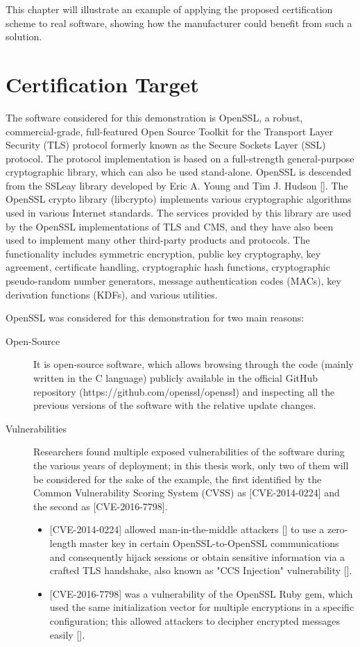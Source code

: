 This chapter will illustrate an example of applying the proposed certification scheme to real software, showing how the manufacturer could benefit from such a solution.

\section{Certification Target}
The software considered for this demonstration is OpenSSL, a robust, commercial-grade, full-featured Open Source Toolkit for the Transport Layer Security (TLS) protocol formerly known as the Secure Sockets Layer (SSL) protocol. The protocol implementation is based on a full-strength general-purpose cryptographic library, which can also be used stand-alone.
OpenSSL is descended from the SSLeay library developed by Eric A. Young and Tim J. Hudson []. The OpenSSL crypto library (libcrypto) implements various cryptographic algorithms used in various Internet standards. The services provided by this library are used by the OpenSSL implementations of TLS and CMS, and they have also been used to implement many other third-party products and protocols.
The functionality includes symmetric encryption, public key cryptography, key agreement, certificate handling, cryptographic hash functions, cryptographic pseudo-random number generators, message authentication codes (MACs), key derivation functions (KDFs), and various utilities.

OpenSSL was considered for this demonstration for two main reasons:
\begin{description}
    \item[Open-Source] It is open-source software, which allows browsing through the code (mainly written in the C language) publicly available in the official GitHub repository (https://github.com/openssl/openssl) and inspecting all the previous versions of the software with the relative update changes.
    \item[Vulnerabilities] Researchers found multiple exposed vulnerabilities of the software during the various years of deployment; in this thesis work, only two of them will be considered for the sake of the example, the first identified by the Common Vulnerability Scoring System (CVSS) as [CVE-2014-0224] and the second as [CVE-2016-7798].
    
    \begin{itemize}
        \item {[CVE-2014-0224]} allowed man-in-the-middle attackers [] to use a zero-length master key in certain OpenSSL-to-OpenSSL communications and consequently hijack sessions or obtain sensitive information via a crafted TLS handshake, also known as "CCS Injection" vulnerability [].
        \item {[CVE-2016-7798]} was a vulnerability of the OpenSSL Ruby gem, which used the same initialization vector for multiple encryptions in a specific configuration; this allowed attackers to decipher encrypted messages easily [].

    \end{itemize}
\end{description}

